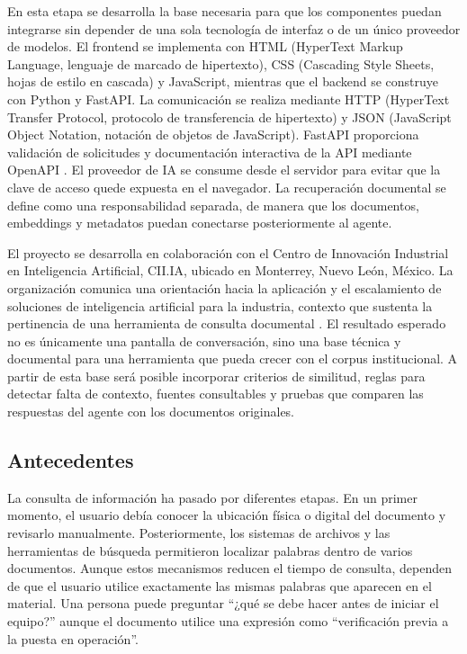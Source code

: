 En esta etapa se desarrolla la base necesaria para que los componentes puedan integrarse sin depender de una sola tecnología de interfaz o de un único proveedor de modelos. El frontend se implementa con HTML (HyperText Markup Language, lenguaje de marcado de hipertexto), CSS (Cascading Style Sheets, hojas de estilo en cascada) y JavaScript, mientras que el backend se construye con Python y FastAPI. La comunicación se realiza mediante HTTP (HyperText Transfer Protocol, protocolo de transferencia de hipertexto) y JSON (JavaScript Object Notation, notación de objetos de JavaScript). FastAPI proporciona validación de solicitudes y documentación interactiva de la API mediante OpenAPI \citep{fastapiDocs}. El proveedor de IA se consume desde el servidor para evitar que la clave de acceso quede expuesta en el navegador. La recuperación documental se define como una responsabilidad separada, de manera que los documentos, embeddings y metadatos puedan conectarse posteriormente al agente.

El proyecto se desarrolla en colaboración con el Centro de Innovación Industrial en Inteligencia Artificial, CII.IA, ubicado en Monterrey, Nuevo León, México. La organización comunica una orientación hacia la aplicación y el escalamiento de soluciones de inteligencia artificial para la industria, contexto que sustenta la pertinencia de una herramienta de consulta documental \citep{ciiia2026,ciiia2026b}. El resultado esperado no es únicamente una pantalla de conversación, sino una base técnica y documental para una herramienta que pueda crecer con el corpus institucional. A partir de esta base será posible incorporar criterios de similitud, reglas para detectar falta de contexto, fuentes consultables y pruebas que comparen las respuestas del agente con los documentos originales.

\subsection{Antecedentes}

La consulta de información ha pasado por diferentes etapas. En un primer momento, el usuario debía conocer la ubicación física o digital del documento y revisarlo manualmente. Posteriormente, los sistemas de archivos y las herramientas de búsqueda permitieron localizar palabras dentro de varios documentos. Aunque estos mecanismos reducen el tiempo de consulta, dependen de que el usuario utilice exactamente las mismas palabras que aparecen en el material. Una persona puede preguntar ``¿qué se debe hacer antes de iniciar el equipo?'' aunque el documento utilice una expresión como ``verificación previa a la puesta en operación''.

